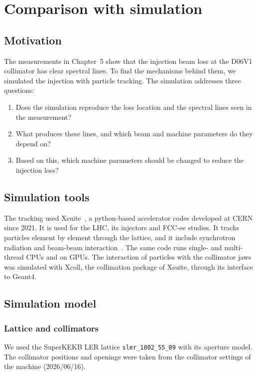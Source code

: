 \chapter{Comparison with simulation}\label{sec:Comparison with simulation}

\section{Motivation}

The measurements in Chapter~5 show that the injection beam loss at the D06V1 collimator has clear spectral lines. To find the mechanisms behind them, we simulated the injection with particle tracking. The simulation addresses three questions:

\begin{enumerate}
    \item Does the simulation reproduce the loss location and the spectral lines seen in the measurement?
    \item What produces these lines, and which beam and machine parameters do they depend on?
    \item Based on this, which machine parameters should be changed to reduce the injection loss?
\end{enumerate}



\section{Simulation tools}
The tracking used Xsuite~\cite{Xsuite}, a python-based accelerator codes developed at CERN since 2021. It is used for the LHC, its injectors and FCC-ee studies. It tracks particles element by element through the lattice, and it include synchrotron radiation and beam-beam interaction~\cite{XsuitePhysicsManual}. The same code runs single- and multi-thread CPUs and on GPUs. The interaction of particles with the collimator jaws was simulated with Xcoll, the collimation package of Xsuite, through its interface to Geant4. 

\section{Simulation model}
\subsection{Lattice and collimators}
We used the SuperKEKB LER lattice  \texttt{sler\_1802\_55\_09} with its aperture model. The collimator positions and openings were taken from the collimator settings of the machine (2026/06/16). 

